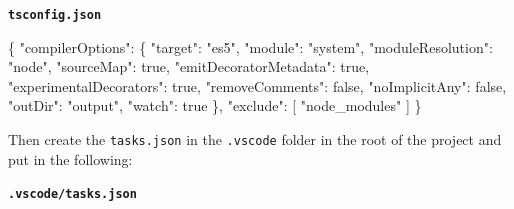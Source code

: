 \documentclass[12pt,]{article}
\newenvironment{Shaded}{}{}
\newcommand{\KeywordTok}[1]{\textcolor[rgb]{0.00,0.00,1.00}{{#1}}}
\newcommand{\DataTypeTok}[1]{{#1}}
\newcommand{\StringTok}[1]{\textcolor[rgb]{0.00,0.50,0.50}{{#1}}}
\newcommand{\OtherTok}[1]{\textcolor[rgb]{1.00,0.25,0.00}{{#1}}}
\newcommand{\FunctionTok}[1]{{#1}}
\begin{document}
\textbf{\texttt{tsconfig.json}}

\begin{Shaded}
\begin{Highlighting}[numbers=left,,]
\FunctionTok{\{}
  \DataTypeTok{"compilerOptions"}\FunctionTok{:} \FunctionTok{\{}
    \DataTypeTok{"target"}\FunctionTok{:} \StringTok{"es5"}\FunctionTok{,}
    \DataTypeTok{"module"}\FunctionTok{:} \StringTok{"system"}\FunctionTok{,}
    \DataTypeTok{"moduleResolution"}\FunctionTok{:} \StringTok{"node"}\FunctionTok{,}
    \DataTypeTok{"sourceMap"}\FunctionTok{:} \KeywordTok{true}\FunctionTok{,}
    \DataTypeTok{"emitDecoratorMetadata"}\FunctionTok{:} \KeywordTok{true}\FunctionTok{,}
    \DataTypeTok{"experimentalDecorators"}\FunctionTok{:} \KeywordTok{true}\FunctionTok{,}
    \DataTypeTok{"removeComments"}\FunctionTok{:} \KeywordTok{false}\FunctionTok{,}
    \DataTypeTok{"noImplicitAny"}\FunctionTok{:} \KeywordTok{false}\FunctionTok{,}
    \DataTypeTok{"outDir"}\FunctionTok{:} \StringTok{"output"}\FunctionTok{,}
    \DataTypeTok{"watch"}\FunctionTok{:} \KeywordTok{true}
  \FunctionTok{\},}
  \DataTypeTok{"exclude"}\FunctionTok{:} \OtherTok{[}
    \StringTok{"node_modules"}
  \OtherTok{]}
\FunctionTok{\}}
\end{Highlighting}
\end{Shaded}

Then create the \texttt{tasks.json} in the \texttt{.vscode} folder in
the root of the project and put in the following:

\textbf{\texttt{.vscode/tasks.json}}

\begin{Shaded}
\end{Shaded}
\end{document}
